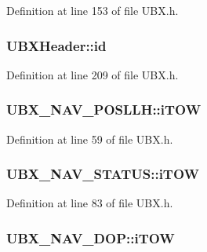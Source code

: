 Definition at line 153 of file U\-B\-X.\-h.

\hypertarget{group___g_s_p_module_gae65b35dcbe44c08985ab3ba9e1e04793}{
\subsubsection[{id}]{ U\-B\-X\-Header\-::id}}\label{group___g_s_p_module_gae65b35dcbe44c08985ab3ba9e1e04793}


Definition at line 209 of file U\-B\-X.\-h.

\hypertarget{group___g_s_p_module_ga85f34b0228c0157d478dfcefef43096f}{
\subsubsection[{i\-T\-O\-W}]{ U\-B\-X\-\_\-\-N\-A\-V\-\_\-\-P\-O\-S\-L\-L\-H\-::i\-T\-O\-W}}\label{group___g_s_p_module_ga85f34b0228c0157d478dfcefef43096f}


Definition at line 59 of file U\-B\-X.\-h.

\hypertarget{group___g_s_p_module_ga8413a77f5cf599f1d89fce98a304c5c1}{
\subsubsection[{i\-T\-O\-W}]{ U\-B\-X\-\_\-\-N\-A\-V\-\_\-\-S\-T\-A\-T\-U\-S\-::i\-T\-O\-W}}\label{group___g_s_p_module_ga8413a77f5cf599f1d89fce98a304c5c1}


Definition at line 83 of file U\-B\-X.\-h.

\hypertarget{group___g_s_p_module_gae5ea4b23ed8d603c7360a18053975010}{
\subsubsection[{i\-T\-O\-W}]{ U\-B\-X\-\_\-\-N\-A\-V\-\_\-\-D\-O\-P\-::i\-T\-O\-W}}\label{group___g_s_p_module_gae5ea4b23ed8d603c7360a18053975010}


